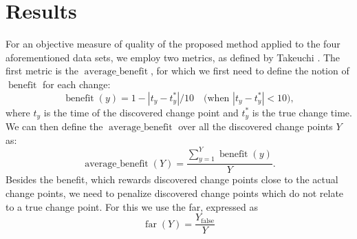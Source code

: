 \section{Results}\label{sec:artificial_data_results}
For an objective measure of quality of the proposed method applied to the four aforementioned data sets, we employ two metrics, as defined by Takeuchi \etal \cite{takeuchi2006unifying}.
The first metric is the $\operatorname*{average \_ benefit}$, for which we first need to define the notion of $\operatorname*{benefit}$ for each change:
\begin{equation}\label{eq:benefit}
  \operatorname*{benefit}(y) = 1 - |t_y - t_y^*| / 10  \mbox{~~~(when } |t_y - t_y^*| < 10 \mbox{)},
\end{equation}
where $t_y$ is the time of the discovered change point and $t_y^*$ is the true change time.
We can then define the $\operatorname*{average \_ benefit}$ over all the discovered change points $Y$ as:
\begin{equation}\label{eq:average_benefit}
  \operatorname*{average \_ benefit}(Y) = \frac{\sum_{y=1}^Y \operatorname*{benefit}(y)}{Y}.
\end{equation}
Besides the benefit, which rewards discovered change points close to the actual change points, we need to penalize discovered change points which do not relate to a true change point.
For this we use the \acrlong{far}, expressed as
\begin{equation}\label{eq:false_alarm_rate}
  \operatorname*{far}(Y) = \frac{Y_{\operatorname*{false}}}{Y}
\end{equation}
